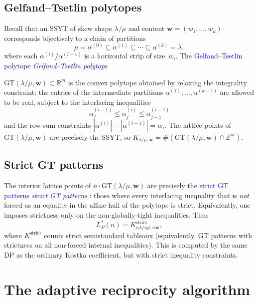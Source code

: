 \documentclass[11pt,reqno]{amsart}
\theoremstyle{definition}
\newcommand{\setZ}{\mathbb{Z}}
\newcommand{\setR}{\mathbb{R}}
\newcommand{\GT}{\mathrm{GT}}
\newcommand{\lam}{\lambda}
\newcommand{\wt}{\mathbf{w}}
\newcommand{\Ehrstar}{L^{*}}
\newcommand{\defin}[1]{%
\relax\ifmmode%
\textcolor{blue}{#1}%
\else \textcolor{blue}{\emph{#1}}%
\fi%
}
\begin{document}
\subsection{Gelfand--Tsetlin polytopes}\label{subs:GTpolytopes}

Recall that an SSYT of skew shape
$\lam/\mu$ and content $\wt = (w_1, \dotsc, w_k)$ corresponds
bijectively to a chain of partitions
\[
  \mu = \alpha^{(0)} \subseteq \alpha^{(1)} \subseteq \dotsb
  \subseteq \alpha^{(k)} = \lam,
\]
where each $\alpha^{(i)} / \alpha^{(i-1)}$ is a horizontal strip
of size~$w_i$.  The \defin{Gelfand--Tsetlin polytope}
$\GT(\lam/\mu, \wt) \subset \setR^m$ is the convex polytope obtained
by relaxing the integrality constraint: the entries of the
intermediate partitions $\alpha^{(1)}, \dotsc, \alpha^{(k-1)}$ are
allowed to be real, subject to the interlacing inequalities
\[
  \alpha^{(i-1)}_j \leq \alpha^{(i)}_j \leq \alpha^{(i-1)}_{j-1}
\]
and the row-sum constraints
$|\alpha^{(i)}| - |\alpha^{(i-1)}| = w_i$.
The lattice points of $\GT(\lam/\mu, \wt)$ are precisely the SSYT,
so $K_{\lam/\mu, \wt} = \#(\GT(\lam/\mu, \wt) \cap \setZ^m)$.

\subsection{Strict GT patterns}\label{subs:strictGT}

The interior lattice points of $n \cdot \GT(\lam/\mu, \wt)$ are
precisely the \defin{strict GT patterns}: those where every interlacing
inequality that is \emph{not} forced as an equality in the affine hull
of the polytope is strict.  Equivalently, one imposes strictness only on
the non-globally-tight inequalities.  Thus
\begin{equation}\label{eq:strict-kostka}
  \Ehrstar_P(n) = K^{\mathrm{strict}}_{n\lam/n\mu, n\wt},
\end{equation}
where $K^{\mathrm{strict}}$ counts strict semistandard tableaux
(equivalently, GT patterns with strictness on all non-forced internal
inequalities).  This is computed by the same DP as the ordinary Kostka
coefficient, but with strict inequality constraints.


\section{The adaptive reciprocity algorithm}\label{sec:algorithm}
\end{document}
